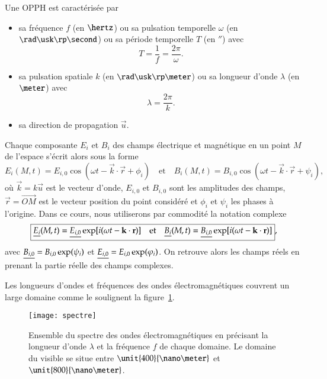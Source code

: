 Une OPPH est caractérisée par 
\begin{itemize}
	\item sa fréquence $f$ (en $\hertz$) ou sa pulsation temporelle $\omega$ 
		(en $\rad \usk \rp \second$) ou sa période temporelle $T$ (en $\second$)
	  avec
	  \begin{equation*}
		  T = \frac{1}{f} = \frac{2\pi}{\omega}.
	  \end{equation*}
  	\item sa pulsation spatiale $k$ (en $\rad \usk \rp \meter$) ou 
	  sa longueur d'onde $\lambda$ (en $\meter$) avec 
	  \begin{equation*}
		  \lambda = \dfrac{2 \pi}{k}.
	  \end{equation*}
	\item sa direction de propagation $\vec{u}$.
\end{itemize}

Chaque composante $E_i$ et $B_i$ des champs électrique et magnétique en un point 
$M$ de l'espace s'écrit alors
sous la forme
\begin{equation*}
	E_i(M, t) = E_{i, 0}\cos(\omega t - \vec{k} \cdot \vec{r} + \phi_i)
	\quad \mathrm{et} \quad
	B_i(M, t) = B_{i, 0}\cos(\omega t - \vec{k} \cdot \vec{r} + \psi_i),
\end{equation*}
où $\vec{k} = k \vec{u}$ est le vecteur d'onde, $E_{i, 0}$ et $B_{i, 0}$ 
sont les amplitudes des champs, 
$\vec{r} = \vec{OM}$ est le vecteur position du point considéré
et $\phi_i$ et $\psi_i$ les phases à l'origine. 
Dans ce cours, nous utiliserons par commodité la notation complexe
\begin{equation*}
	\boxed{
		\underline{E_i}(M, t) = \underline{E_{i, 0}}\exp[i(
		\omega t - \mathbf{k} \cdot \mathbf{r})]
	\quad \mathrm{et} \quad
\underline{B_i}(M, t) = \underline{B_{i, 0}}\exp[i(\omega t - \mathbf{k} \cdot \mathbf{r})]},
\end{equation*}
avec $\underline{B_{i, 0}} = B_{i, 0} \exp(\psi_i)$ et 
$\underline{E_{i, 0}} = E_{i, 0} \exp(\varphi_i)$. On retrouve alors les champs réels
en prenant la partie réelle des champs complexes.

\begin{rem}
Les longueurs d'ondes et fréquences des ondes électromagnétiques couvrent un large
domaine comme le soulignent la figure~\ref{fig:maxwell_spectre}.
\end{rem}

\begin{figure}[]
	\centering
	\texttt{[image: spectre]}
	\caption{Ensemble du spectre des ondes électromagnétiques en précisant
	la longueur d'onde $\lambda$ et la fréquence $f$ de chaque domaine. Le
	domaine du visible se situe entre $\unit{400}{\nano \meter}$ et
	$\unit{800}{\nano \meter}$.}%
	\label{fig:maxwell_spectre}
\end{figure}

